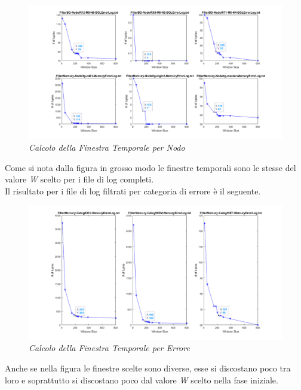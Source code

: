 \begin{figure}[H]
	\centering
	\includegraphics[width=\textwidth]{img/hw6/cwin_mercury_bgl.png}
	\caption{\textit{Calcolo della Finestra Temporale per Nodo}}
\end{figure}
Come si nota dalla figura in grosso modo le finestre temporali sono le stesse del valore \textit{W} scelto per i file di log completi.
\\Il risultato per i file di log filtrati per categoria di errore è il seguente.
\begin{figure}[H]
	\centering
	\includegraphics[width=\textwidth]{img/hw6/cwin_mercury.png}
	\caption{\textit{Calcolo della Finestra Temporale per Errore}}
\end{figure}
Anche se nella figura le finestre scelte sono diverse, esse si discostano poco tra loro e soprattutto si discostano poco dal valore \textit{W} scelto nella fase iniziale.


